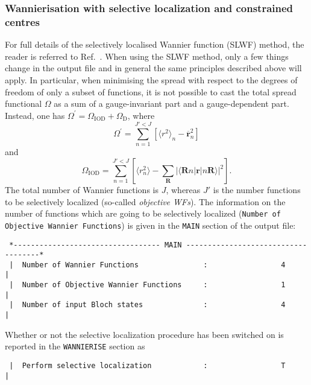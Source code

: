 \subsubsection{Wannierisation with selective localization and constrained centres}
For full details of the selectively localised Wannier function (SLWF) method, the reader is referred to Ref.~\cite{Marianetti}. 
When using the SLWF method, only a few things change in the output file
and in general the same principles described above will apply. 
In particular, when minimising the spread with respect to the degrees of freedom of only a subset 
of functions, it is not possible to cast the total spread functional $\Omega$ as a sum of a 
gauge-invariant part and a gauge-dependent part. Instead, one has
$\Omega^{'} = \Omega_{\mathrm{IOD}} + \Omega_{\mathrm{D}}$, where
$$\Omega^{'} = \sum_{n=1}^{J'<J} \left[\langle r^2 \rangle_n - \overline{\mathbf{r}}_{n}^{2}\right]$$
and 
$$\Omega_{\mathrm{IOD}} = \sum_{n=1}^{J'<J} \left[\langle r^2_n \rangle- \sum_{\mathbf{R}} \vert\langle\mathbf{R}n\vert \mathbf{r} \vert n\mathbf{R}\rangle\vert^2 \right].$$
The total number of Wannier functions is $J$, whereas $J'$ is the number functions to be selectively localized (so-called \emph{objective WFs}).
The information on the number of functions which are going to be selectively localized \mbox{({\tt Number of Objective Wannier Functions})}
is given in the {\tt MAIN} section of the output file:
\begin{verbatim}
 *---------------------------------- MAIN ------------------------------------*
 |  Number of Wannier Functions               :                 4             |
 |  Number of Objective Wannier Functions     :                 1             |
 |  Number of input Bloch states              :                 4             |
\end{verbatim}
Whether or not the selective localization procedure has been switched on is reported in
the {\tt WANNIERISE} section as
\begin{verbatim}
 |  Perform selective localization            :                 T             |
\end{verbatim}

